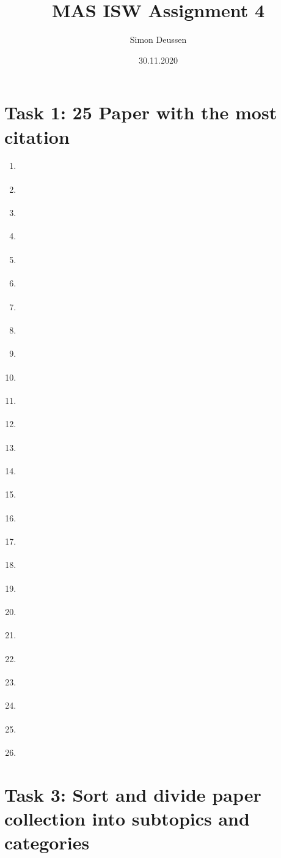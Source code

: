 \documentclass{article}
\title{MAS ISW Assignment 4}
\date{30.11.2020}
\author{Simon Deussen}
\begin{document}
  \maketitle

  \section*{Task 1: 25 Paper with the most citation}
  \begin{enumerate}
    \item \cite{Derrac2011}
    \item \cite{Mavrovouniotis2017}
    \item \cite{Lynn2015}
    \item \cite{Bechar2016}
    \item \cite{Weiss2011}
    \item \cite{Pedersen2006}
    \item \cite{Konur2012}
    \item \cite{Schneider2003}
    \item \cite{Winfield2008}
    \item \cite{Chung2018}
    \item \cite{Vasconez2019}
    \item \cite{Roldan2016}
    \item \cite{Liu2006} 
    \item \cite{Vigelius2014}
    \item \cite{Ball2015}
    \item \cite{VillaHenriksen2020}
    \item \cite{CORTES2017}
    \item \cite{Oberti2016}
    \item \cite{Innocente2019}
    \item \cite{Din2018}
    \item \cite{Gao2018}
    \item \cite{Fu2020}
    \item \cite{Jones2019}
    \item \cite{Miner2007}
    \item \cite{Osaba2020}
    \item \cite{Herck2020}
  \end{enumerate}

  \section*{Task 3: Sort and divide paper collection into subtopics and categories}
\end{document}
